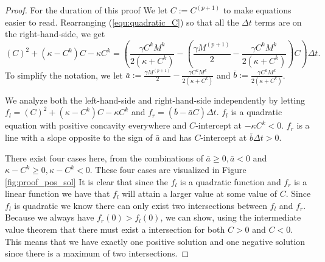 \begin{proof}
  For the duration of this proof We let $C := C^{(p+1)}$ to make equations easier to read.
  Rearranging (\ref{equ:quadratic_C}) so that all the $\Delta t$ terms are on the right-hand-side, we get
  \begin{equation}
    \left( C \right)^2 + \left(\kappa - C^{k}\right)C - \kappa C^{k} =  \left(\frac{\gamma C^k M^k}{2\left(\kappa + C^k\right)} - \left(\frac{\gamma M^{(p+1)}}{2} - \frac{\gamma C^k M^k}{2 \left(\kappa + C^k\right)} \right)C \right) \Delta t.
  \end{equation}
  To simplify the notation, we let $\bar{a} := \frac{\gamma M^{(p+1)}}{2} - \frac{\gamma C^k M^k}{2\left(\kappa + C^k\right)}$ and $\bar{b} := \frac{\gamma C^k M^k}{2\left(\kappa + C^k\right)}$.
  
  We analyze both the left-hand-side and right-hand-side independently by letting $f_l = \left( C \right)^2 + \left(\kappa - C^{k}\right)C - \kappa C^{k}$ and $f_r =  \left(\bar{b} - \bar{a} C \right) \Delta t$.
  $f_l$ is a quadratic equation with positive concavity everywhere and $C$-intercept at $-\kappa C^{k} < 0$.
  $f_r$ is a line with a slope opposite to the sign of $\bar{a}$ and has $C$-intercept at $\bar{b}\Delta t > 0$.
  
  There exist four cases here, from the combinations of $\bar{a} \ge 0, \bar{a} < 0$ and $\kappa - C^k \ge 0, \kappa -C^k < 0$.
  These four cases are visualized in Figure \ref{fig:proof_pos_sol}
  It is clear that since the $f_l$ is a quadratic function and $f_r$ is a linear function we have that $f_l$ will attain a larger value at some value of $C$. 
  Since $f_l$ is quadratic we know there can only exist two intersections between $f_l$ and $f_r$.
  Because we always have $f_r(0) > f_l(0)$, we can show, using the intermediate value theorem that there must exist a intersection for both $C >0$ and $C < 0$.
  This means that we have exactly one positive solution and one negative solution since there is a maximum of two intersections.
\end{proof}


